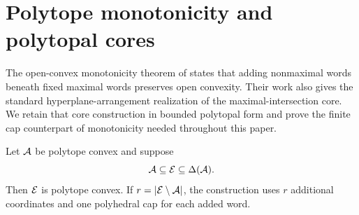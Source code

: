 \section{Polytope monotonicity and polytopal cores}
\label{sec:monotonicity}

The open-convex monotonicity theorem of \citet{CruzEtAl2019} states that adding nonmaximal words beneath fixed maximal words preserves open convexity.  Their work also gives the standard hyperplane-arrangement realization of the maximal-intersection core.  We retain that core construction in bounded polytopal form and prove the finite cap counterpart of monotonicity needed throughout this paper.

\begin{theorem}
\label{thm:polytope-monotonicity}
Let $\mathcal A$ be polytope convex and suppose
\[
 \mathcal A\subseteq\mathcal E\subseteq\Delta(\mathcal A).
\]
Then $\mathcal E$ is polytope convex.  If $r=|\mathcal E\setminus\mathcal A|$, the construction uses $r$ additional coordinates and one polyhedral cap for each added word.
\end{theorem}

